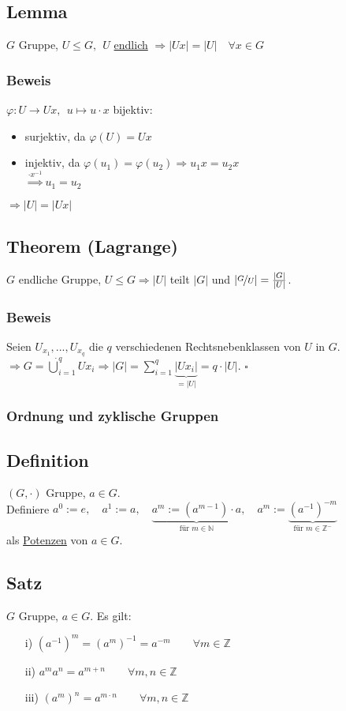 \documentclass[12pt,titlepage, pdf]{article}
\newcommand{\f}[2]{\nicefrac{#1}{#2}}
\newcommand{\uline}[1]{\underline{#1}}
\renewcommand{\>}{\rightarrow}
\renewcommand{\*}{\cdot}
\renewcommand{\phi}{\varphi}
\begin{document}
	\subsection{Lemma}
	$G$ Gruppe, $U \leq G,~~ U$ \uline{endlich} $\Rightarrow |Ux| = |U|\quad \forall x \in G$
	\subsubsection*{Beweis}
	$\phi: U \rightarrow Ux,~~ u \mapsto u \cdot x$ bijektiv:
	\begin{itemize}
		\item surjektiv, da $\phi(U) = Ux$
		\item injektiv, da $\phi(u_1) = \phi(u_2) \Rightarrow u_1x = u_2x$\\
		\noindent\hspace*{44.5mm}$\overset{\cdot x^{-1}}{\Rightarrow} u_1 = u_2$
	\end{itemize}
	$ \Rightarrow |U| = |Ux|$
	\subsection{Theorem (Lagrange)}
	$G$ endliche Gruppe, $U \leq G \Rightarrow |U|$ teilt $|G|$ und $| \f{G}{U} | = \frac{|G|}{|U|}$.
	\subsubsection*{Beweis} Seien $U_{x_1},..., U_{x_q}$ die $q$ verschiedenen Rechtsnebenklassen von $U$ in $G$. \\
	$\Rightarrow G = \dot{\bigcup}^q_{i=1} Ux_i \Rightarrow |G| =  \sum_{i = 1}^{q}  \underbrace{|Ux_i|}_{=|U|} = q \cdot |U|.$
	\hfill$\square$
	\subsubsection*{Ordnung und zyklische Gruppen}
	\subsection{Definition}
	$(G, \cdot )$ Gruppe, $a \in G$.\\ Definiere $a^0 := e,\quad a^1 := a,\quad \underbrace{a^m := (a^{m-1}) \cdot a}_{\textrm{für }m \in \mathds{N}},\quad a^m := \underbrace{ (a^{-1})^{-m}}_{\textrm{für }m \in \mathds{Z}^-}$\\
	als \uline{Potenzen} von $a \in G$.
	\subsection{Satz}
	$G$ Gruppe, $a \in G$. Es gilt:
	\begin{itemize}
		\item[i)] $(a^{-1})^m = (a^m)^{-1} = a^{-m} \qquad \forall m \in \mathds{Z}$
		\item[ii)] $a^ma^n = a^{m+n} \qquad \forall m,n \in \mathds{Z}$
		\item[iii)] $(a^m)^n = a^{m \cdot n} \qquad \forall m,n \in \mathds{Z}$
	\end{itemize}
\end{document}
